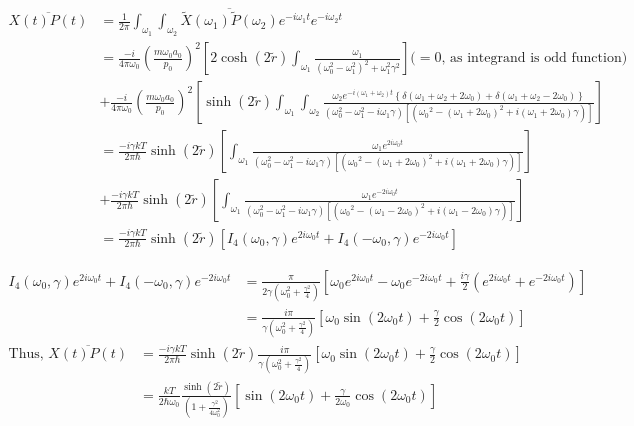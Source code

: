 \documentclass[12pt, twoside]{article}
\begin{document}
$\begin{aligned} \overline{X( t ) P(t)} &= \frac { 1 } { 2 \pi } \int _ { \omega _ { 1 }}\int_{\omega_2} \overline{\widetilde { X } ( \omega_1 )\widetilde { P } ( \omega_2 )}  e ^ { - i \omega _ { 1 } t } e ^ { - i \omega _ { 2 } t } \\ &= \frac{-i}{4\pi \omega_0}\left(\frac { m \omega _ { 0 } a_0 } { p _ { 0 } }\right)^2 \left[ 2 \cosh(2\tilde{r}) \int_{\omega_1} \frac{\omega_1}{(\omega_0^2 - \omega_1 ^2)^2 + \omega_1 ^2 \gamma^2}\right] \text{($=0$, as integrand is odd function)} \\&+ \frac{-i}{4\pi\omega_0}\left(\frac { m \omega _ { 0 } a_0 } { p _ { 0 } }\right)^2 \left[ \sinh(2\tilde{r}) \int_{\omega_1}\int_{\omega_2} \frac{\omega_2 e^{-i(\omega_1 + \omega_2) t} \left\{\delta(\omega_1 + \omega_2 + 2\omega_0) + \delta(\omega_1 + \omega_2 - 2\omega_0) \right\}}{(\omega_0^2 - \omega_1 ^2 - i\omega_1\gamma) [({\omega_0}^2 - (\omega_1 + 2\omega_0)^2 + i(\omega_1 + 2 \omega_0) \gamma)]}\right] \\&= \frac{-i\gamma k T}{2 \pi \hbar} \sinh(2\tilde{r}) \left[\int_{\omega_1} \frac{\omega_1 e^{2i\omega_0 t}}{(\omega_0^2 - \omega_1 ^2 - i\omega_1\gamma) [({\omega_0}^2 - (\omega_1 + 2\omega_0)^2 + i(\omega_1 + 2 \omega_0) \gamma)]} \right] \\ &+ \frac{-i\gamma k T}{2 \pi \hbar} \sinh(2\tilde{r}) \left[\int_{\omega_1} \frac{\omega_1 e^{-2i\omega_0 t}}{(\omega_0^2 - \omega_1 ^2 - i\omega_1\gamma) [({\omega_0}^2 - (\omega_1 - 2\omega_0)^2 + i(\omega_1 - 2 \omega_0) \gamma)]}   \right] \\& = \frac{-i\gamma k T}{2 \pi \hbar} \sinh(2\tilde{r}) \left[I_4(\omega_0,\gamma) e^{2i\omega_0 t} + I_4(-\omega_0,\gamma)e^{-2i\omega_0 t}\right]
\end{aligned}$

$\begin{aligned}
I_4(\omega_0,\gamma) e^{2i\omega_0 t} + I_4(-\omega_0,\gamma)e^{-2i\omega_0 t} &= \frac{\pi}{2\gamma(\omega_0 ^2 + \frac{\gamma^2}{4})} \left[\omega_0 e^{2i\omega_0 t} - \omega_{ 0 } e^{-2 i \omega_0 t} + \frac{i\gamma}{2}(e^{2i\omega_0 t} + e^{-2i \omega_0 t})\right]
\\&= \frac{i \pi}{\gamma(\omega_0 ^2 + \frac{\gamma^2}{4})} \left[\omega_0 \sin(2\omega_0 t) + \frac{\gamma}{2}\cos(2\omega_0 t)\right]
\end{aligned}$
\begin{equation}\label{eq: x_p_average}
\begin{aligned}
\text{Thus, } \overline{X( t ) P(t)} &= \frac{-i\gamma k T}{2 \pi \hbar} \sinh(2\tilde{r}) \frac{i \pi}{\gamma(\omega_0 ^2 + \frac{\gamma^2}{4})} \left[\omega_0 \sin(2\omega_0 t) + \frac{\gamma}{2}\cos(2\omega_0 t)\right] \\&= \frac{k T}{2 \hbar \omega_0}  \frac{\sinh(2\tilde{r})}{(1 + \frac{\gamma^2}{4\omega_0 ^2})} \left[ \sin(2\omega_0 t) + \frac{\gamma}{2\omega_0}\cos(2\omega_0 t)\right]
\end{aligned}
\end{equation}
\end{document}
